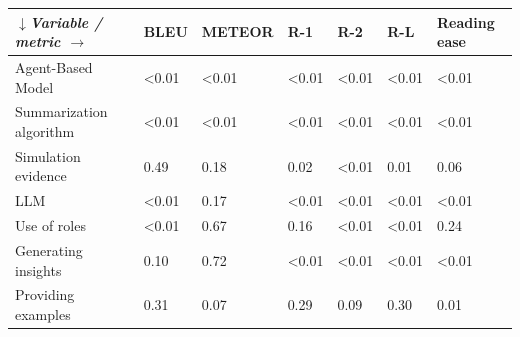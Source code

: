 \begin{tabular}{|l|l|l|l|l|l|l|}
\hline
\textit{$\downarrow$Variable / metric $\rightarrow$} & BLEU & METEOR & R-1 & R-2 & R-L & Reading ease \\
 \hline
 Agent-Based Model & \textless{}0.01 & \textless{}0.01 & \textless{}0.01 & \textless{}0.01 & \textless{}0.01 & \textless{}0.01 \\
 \hline
 Summarization algorithm & \textless{}0.01 & \textless{}0.01 & \textless{}0.01 & \textless{}0.01 & \textless{}0.01 & \textless{}0.01 \\
 \hline
 Simulation evidence & 0.49 & 0.18 & 0.02 & \textless{}0.01 & 0.01 & 0.06 \\
 \hline
 LLM & \textless{}0.01 & 0.17 & \textless{}0.01 & \textless{}0.01 & \textless{}0.01 & \textless{}0.01 \\
 \hline
 Use of roles & \textless{}0.01 & 0.67 & 0.16 & \textless{}0.01 & \textless{}0.01 & 0.24 \\
 \hline
 Generating insights & 0.10 & 0.72 & \textless{}0.01 & \textless{}0.01 & \textless{}0.01 & \textless{}0.01 \\
 \hline
 Providing examples & 0.31 & 0.07 & 0.29 & 0.09 & 0.30 & 0.01 \\
\hline
\end{tabular}
